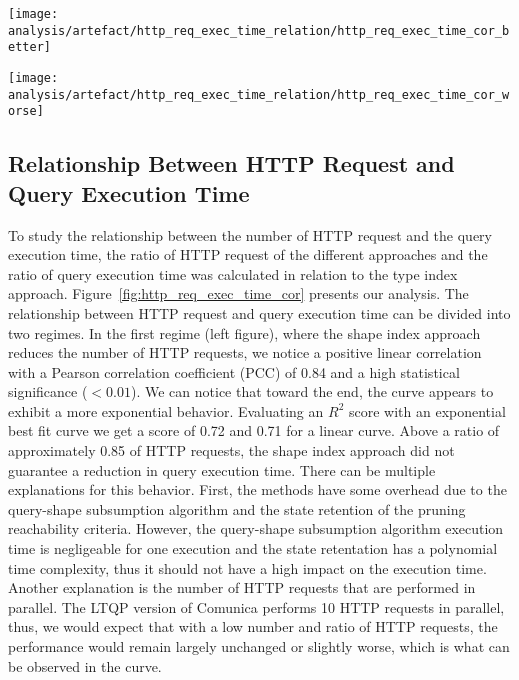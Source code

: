 \begin{figure*}[htbp]
    \centering
    \begin{minipage}[t]{0.45\linewidth}
        \centering
        \texttt{[image: analysis/artefact/http\_req\_exec\_time\_relation/http\_req\_exec\_time\_cor\_better]}
        \label{fig:http_req_exec_time_cor_better}
    \end{minipage}
    \hspace{0.05\textwidth}
    \begin{minipage}[t]{0.45\linewidth}
        \centering
        \texttt{[image: analysis/artefact/http\_req\_exec\_time\_relation/http\_req\_exec\_time\_cor\_worse]}
        \label{fig:http_req_exec_time_cor_worse}
    \end{minipage}

    \caption{
        The data show two regimes in the relation between the number of HTTP requests and the execution time, 
        we see a more linear correlation on the up figure than on the down figure.
        }
    \label{fig:http_req_exec_time_cor}
\end{figure*}

\subsection{Relationship Between HTTP Request and Query Execution Time}


To study the relationship between the number of HTTP request and the query execution time, the ratio of HTTP request of the different approaches and the ratio of query execution time was 
calculated in relation to the type index approach.
Figure~\ref{fig:http_req_exec_time_cor} presents our analysis.
The relationship between HTTP request and query execution time can be divided into two regimes.
In the first regime (left figure), where the shape index approach reduces the number of HTTP requests, we notice a positive linear correlation with a Pearson correlation coefficient (PCC) of 0.84 and a high statistical significance ($< 0.01$).
We can notice that toward the end, the curve appears to exhibit a more exponential behavior.
Evaluating an $R^2$ score with an exponential best fit curve we get a score of 0.72 and 0.71 for a linear curve.
Above a ratio of approximately 0.85 of HTTP requests, the shape index approach did not guarantee a reduction in query execution time.
There can be multiple explanations for this behavior.
First, the methods have some overhead due to the query-shape subsumption algorithm and the state retention of the pruning reachability criteria.
However, the query-shape subsumption algorithm execution time is negligeable for one execution and the state retentation has a polynomial time complexity, thus it should not have a high impact on the execution time.
Another explanation is the number of HTTP requests that are performed in parallel.
The LTQP version of Comunica performs 10 HTTP requests in parallel, thus, we would expect that with a low number and ratio of HTTP requests, the performance would remain largely unchanged or slightly worse, which is what can be observed in the curve.

